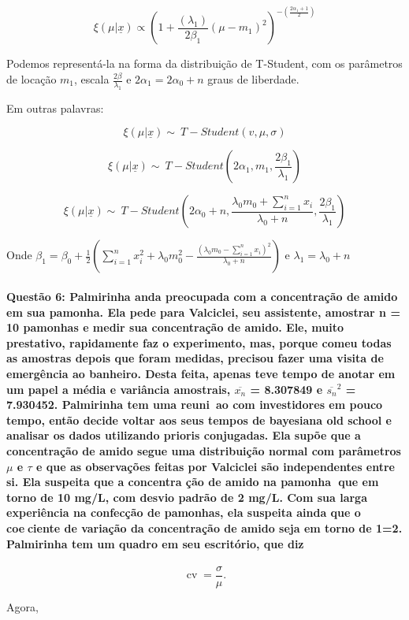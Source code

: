 \documentclass{article}
\begin{document}
	$$\xi(\mu | \underline{x}) \propto (1 + \frac{(\lambda_1)}{2 \beta_1}(\mu - m_1)^2)^{-(\frac{2\alpha_1 + 1}{2})}$$
	
	
	Podemos representá-la na forma da distribuição de T-Student, com os parâmetros de locação $m_1$, escala $\frac{2\beta}{\lambda_1}$ e $2 \alpha_1 = 2\alpha_0 + n$ graus de liberdade.
	
	Em outras palavras:
	
	$$\xi(\mu | \underline{x}) \sim\ T-Student(v, \mu, \sigma)$$
	
	$$\xi(\mu | \underline{x}) \sim\ T-Student(2 \alpha_1, m_1, \frac{2\beta_1}{\lambda_1})$$
	
	$$\xi(\mu | \underline{x}) \sim\ T-Student(2 \alpha_0 + n, \frac{\lambda_0 m_0 + \sum_{i=1}^{n}x_i}{\lambda_0 + n}, \frac{2\beta_1}{\lambda_1})$$
	
	Onde $\beta_1 = \beta_0 + \frac{1}{2} (\sum_{i=1}^{n}x_i^2 + \lambda_0 m_0^2 - \frac{(\lambda_0 m_0 - \sum_{i=1}^{n}x_i)^2}{\lambda_0 + n})$ e $\lambda_1 = \lambda_0 + n$
	

	\paragraph{Questão 6: Palmirinha anda preocupada com a concentração de amido em sua pamonha.
		Ela pede para Valciclei, seu assistente, amostrar n = 10 pamonhas e
		medir sua concentração de amido.
		Ele, muito prestativo, rapidamente faz o experimento, mas, porque comeu
		todas as amostras depois que foram medidas, precisou fazer uma visita de
		emergência ao banheiro. Desta feita, apenas teve tempo de anotar em um
		papel a média e variância amostrais, $\overline{x_n}$ = 8.307849 e $\overline{s_n}^2$ = 7.930452.
		Palmirinha tem uma reuni~ao com investidores em pouco tempo, então decide
		voltar aos seus tempos de bayesiana old school e analisar os dados
		utilizando prioris conjugadas. Ela supõe que a concentração de amido segue
		uma distribuição normal com parâmetros $\mu$ e $\tau$ e que as observações
		feitas por Valciclei são independentes entre si. Ela suspeita que a concentra
		ção de amido na pamonha que em torno de 10 mg/L, com desvio
		padrão de 2 mg/L. Com sua larga experiência na confecção de pamonhas,
		ela suspeita ainda que o coeciente de variação da concentração de amido
		seja em torno de 1=2. Palmirinha tem um quadro em seu escritório, que
		diz}
	
		\[ \operatorname{cv} = \frac{\sigma}{\mu}. \]
		
		Agora, 
		
\end{document}
